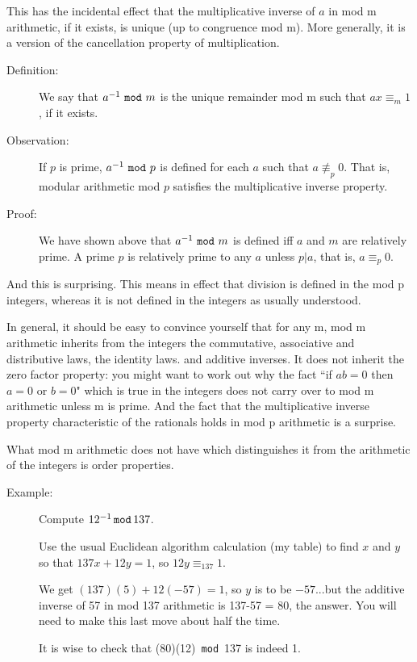 \documentclass[12pt]{article}
\begin{document}
This has the incidental effect that the multiplicative inverse of $a$ in mod m arithmetic, if it exists, is unique (up to congruence mod m).  More generally, it is a version of the cancellation property of multiplication.

\begin{description}

\item[Definition:]  We say that $a^{-1} \,\,{\tt mod}\, \,m$ is the unique remainder mod m such that $ax \equiv_m 1$, if it exists.

\item[Observation:]  If $p$ is prime, $a^{-1}\,\,{\tt mod}\,\,p$ is defined for each $a$ such that $a \not\equiv_p 0$.  That is, modular arithmetic mod $p$ satisfies the multiplicative inverse property.

\item[Proof:]  We have shown above that $a^{-1}\,\,{\tt mod}\,\,m$ is defined iff $a$ and $m$ are relatively prime.  A prime $p$ is relatively prime to any $a$ unless $p|a$, that is, $a \equiv_p 0$.

\end{description}

And this is surprising.  This means in effect that division is defined in the mod p integers, whereas it is not defined in the integers as usually understood.

In general, it should be easy to convince yourself that for any m, mod m arithmetic inherits from the integers the commutative, associative and distributive laws, the identity laws. and additive inverses.  It does not inherit the zero factor property:  you might want to work out
why the fact ``if $ab=0$ then $a=0$ or $b=0$" which is true in the integers does not carry over to mod m arithmetic unless m is prime.
And the fact that the multiplicative inverse property characteristic of the rationals holds in mod p arithmetic is a surprise.

What mod m arithmetic does not have which distinguishes it from the arithmetic of the integers is order properties.

\begin{description}

\item[Example:]  Compute $12^{-1} \,{\tt mod}\, 137$.

Use the usual Euclidean algorithm calculation (my table) to find $x$ and $y$ so that $137x + 12y = 1$, so $12y \equiv_{137} 1$.

We get $(137)(5) + 12(-57) =1$, so $y$ is to be $-57$...but the additive inverse of 57 in mod 137 arithmetic is 137-57 = 80, the answer.
You will need to make this last move about half the time.

It is wise to check that (80)(12) \,{\tt mod}\, 137 is indeed 1.

\end{description}
\end{document}
